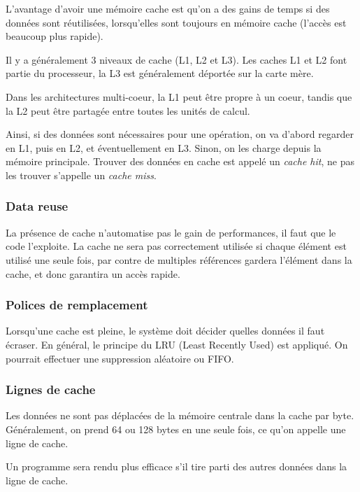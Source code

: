 	L'avantage d'avoir une mémoire cache est qu'on a des gains de temps si des données sont réutilisées, lorsqu'elles sont toujours en mémoire cache (l'accès est beaucoup plus rapide).
	
	Il y a généralement 3 niveaux de cache (L1, L2 et L3). Les caches L1 et L2 font partie du processeur, la L3 est généralement déportée sur la carte mère.
	
	Dans les architectures multi-coeur, la L1 peut être propre à un coeur, tandis que la L2 peut être partagée entre toutes les unités de calcul.
	
	
	Ainsi, si des données sont nécessaires pour une opération, on va d'abord regarder en L1, puis en L2, et éventuellement en L3. Sinon, on les charge depuis la mémoire principale. Trouver des données en cache est appelé un \textit{cache hit}, ne pas les trouver s'appelle un \textit{cache miss}.
	
		\subsubsection{Data reuse}
		
		La présence de cache n'automatise pas le gain de performances, il faut que le code l'exploite. La cache ne sera pas correctement utilisée si chaque élément est utilisé une seule fois, par contre de multiples références gardera l'élément dans la cache, et donc garantira un accès rapide.
	
		\subsubsection{Polices de remplacement}
		
		Lorsqu'une cache est pleine, le système doit décider quelles données il faut écraser. En général, le principe du LRU (Least Recently Used) est appliqué. On pourrait effectuer une suppression aléatoire ou FIFO.
		
		\subsubsection{Lignes de cache}
		
		Les données ne sont pas déplacées de la mémoire centrale dans la cache par byte. Généralement, on prend 64 ou 128 bytes en une seule fois, ce qu'on appelle une ligne de cache.
		
		Un programme sera rendu plus efficace s'il tire parti des autres données dans la ligne de cache.
		

